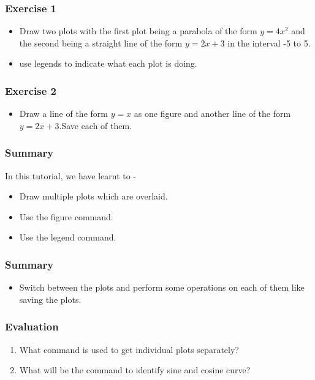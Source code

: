 \documentclass[17pt]{beamer}
\begin{document}
\begin{frame}
\frametitle{Exercise 1}
\label{sec-4}
\begin{itemize}
\item Draw two plots with the first plot
being a parabola of the form $y = 4x^2$ and the second being a
straight line of the form $y = 2x + 3$ in the interval -5 to 5.\pause
\item use legends to
indicate what each plot is doing.
\end{itemize}
\end{frame}

\begin{frame}
\frametitle{Exercise 2}
\label{sec-5}
\begin{itemize}
\item Draw a line of the form $y = x$ as one figure and another line
of the form $y = 2x + 3$.Save each of them.
\end{itemize}
\end{frame}
\begin{frame}
\frametitle{Summary}
\label{sec-7}
In this tutorial, we have learnt to -\pause
\begin{itemize}
\item Draw multiple plots which are overlaid.\pause
\item Use the figure command.\pause
\item Use the legend command.
\end{itemize}
\end{frame}
\begin{frame}
\frametitle{Summary}
\label{sec-8}
\begin{itemize}
\item Switch between the plots and perform some operations on each
of them like saving the plots.
\end{itemize}
\end{frame}

\begin{frame}
\frametitle{Evaluation}
\label{sec-8}
\begin{enumerate}
\item What command is used to get individual plots separately?
\item What will be the command to identify sine and cosine curve?
\end{enumerate}
\end{frame}
\end{document}
